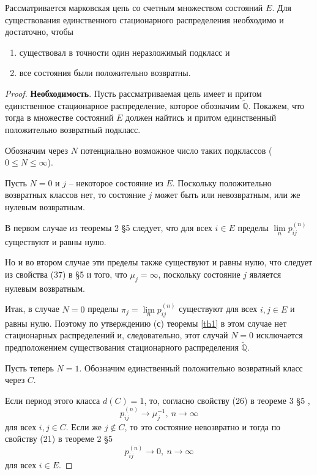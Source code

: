 \begin{theorem}\label{th2}
Рассматривается марковская цепь со счетным множеством состояний $E$. Для существования единственного стационарного распределения необходимо и достаточно, чтобы
\begin{enumerate}[label=(\alph*)]
    \item существовал в точности один неразложимый подкласс и
    \item все состояния были положительно возвратны.
\end{enumerate}

\begin{proof}
\textbf{Необходимость}. Пусть рассматриваемая цепь имеет и притом единственное стационарное распределение, которое обозначим $\widetilde{\mathbb{Q}}$. Покажем, что тогда в множестве состояний $E$ должен найтись и притом единственный положительно возвратный подкласс.

Обозначим через $N$ потенциально возможное число таких подклассов ($0 \leq N \leq \infty$).

Пусть $N = 0$ и $j$ -- некоторое состояние из $E$. Поскольку положительно возвратных классов нет, то состояние $j$ может быть или невозвратным, или же нулевым возвратным.

В первом случае из теоремы 2 \S 5 \cite{shir2} следует, что для всех $i \in E$ пределы $\lim\limits_{n} p_{ij}^{(n)}$ существуют и равны нулю.

Но и во втором случае эти пределы также существуют и равны нулю, что следует из свойства (37) в \S 5 \cite{shir2} и того, что $\mu_j = \infty$, поскольку состояние $j$ является нулевым возвратным.

Итак, в случае $N = 0$ пределы $\pi_j = \lim\limits_{n} p_{ij}^{(n)}$ существуют для всех $i, j \in E$ и равны нулю. Поэтому по утверждению (с) теоремы \ref{th1} в этом случае нет стационарных распределений и, следовательно, этот случай $N = 0$ исключается предположением существования стационарного распределения $\widetilde{\mathbb{Q}}$.

Пусть теперь $N = 1$. Обозначим единственный положительно возвратный класс через $C$.

Если период этого класса $d(C) = 1$, то, согласно свойству (26) в теореме 3 \S 5 \cite{shir2},
$$
p_{ij}^{(n)} \rightarrow \mu_j^{-1}, \  n \rightarrow \infty
$$
для всех $i, j \in C$. Если же $j \notin C$, то это состояние невозвратно и тогда по свойству (21) в теореме 2 \S 5 \cite{shir2}
$$
p_{ij}^{(n)} \rightarrow 0, \  n \rightarrow \infty
$$
для всех $i \in E$.


\end{proof}
\end{theorem}
